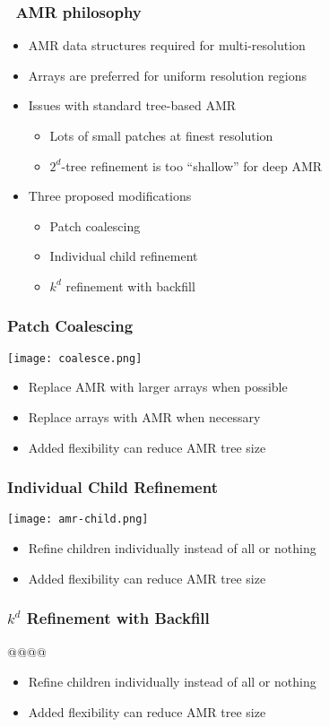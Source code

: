 \begin{frame}[fragile] \frametitle{\cello\ AMR philosophy}
\begin{itemize}
\item AMR data structures required for multi-resolution
\item Arrays are preferred for uniform resolution regions
\item Issues with standard tree-based AMR
\begin{itemize}
\item Lots of small patches at finest resolution
\item $2^d$-tree refinement is too ``shallow'' for deep AMR
\end{itemize}
\item Three proposed modifications
\begin{itemize}
\item Patch coalescing
\item Individual child refinement
\item $k^d$ refinement with backfill
\end{itemize}
\end{itemize}
\end{frame}

\begin{frame}[fragile] \frametitle{Patch Coalescing}
\centerline{\texttt{[image: coalesce.png]}}
\begin{itemize}
\item Replace AMR with larger arrays when possible
\item Replace arrays with AMR when necessary
\item Added flexibility can reduce AMR tree size
\end{itemize}
\end{frame}

\begin{frame}[fragile] \frametitle{Individual Child Refinement}
\centerline{\texttt{[image: amr-child.png]}}
\begin{itemize}
\item Refine children individually instead of all or nothing
\item Added flexibility can reduce AMR tree size
\end{itemize}
\end{frame}

\begin{frame}[fragile] \frametitle{$k^d$ Refinement with Backfill}
@@@@
\begin{itemize}
\item Refine children individually instead of all or nothing
\item Added flexibility can reduce AMR tree size
\end{itemize}
\end{frame}

